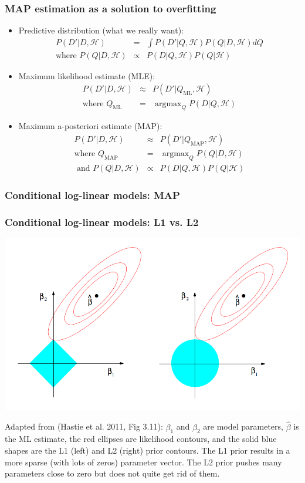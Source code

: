 \documentclass[ignorenonframetext,plain]{beamer}
\DeclareMathOperator*{\argmax}{argmax}
\begin{document}
\begin{frame}\frametitle{MAP estimation as a solution to overfitting}
\begin{itemize}
\item Predictive distribution (what we really want):\begin{eqnarray*}
  P(D'|D,\mathcal{H}) &=& \int P(D'|Q,\mathcal{H}) P(Q|D,\mathcal{H}) dQ \\
  \text{where } P(Q|D,\mathcal{H}) &\propto& P(D|Q,\mathcal{H}) P(Q|\mathcal{H})
\end{eqnarray*}
\item Maximum likelihood estimate (MLE):\begin{eqnarray*}
  P(D'|D,\mathcal{H}) &\approx& P(D'|Q_\text{ML}, \mathcal{H}) \\
\mbox{where } Q_\text{ML} &=& \argmax_Q P(D|Q,\mathcal{H})
\end{eqnarray*}
\item Maximum a-posteriori estimate (MAP):\begin{eqnarray*}
  P(D'|D,\mathcal{H}) &\approx& P(D'|Q_\text{MAP}, \mathcal{H}) \\
\mbox{where } Q_\text{MAP} &=& \argmax_Q P(Q|D,\mathcal{H}) \\
\mbox{ and } P(Q|D,\mathcal{H}) &\propto& P(D|Q,\mathcal{H}) P(Q|\mathcal{H})
\end{eqnarray*}
\end{itemize}
\end{frame}

\begin{frame}\frametitle{Conditional log-linear models: MAP} %

\end{frame}

\begin{frame}\frametitle{Conditional log-linear models: L1 vs. L2} %
\includegraphics[width=.9\textwidth]{images/hastie-fig-3-11.png}

\footnotesize Adapted from (Hastie et al. 2011, Fig 3.11): $\beta_1$
and $\beta_2$ are model parameters, $\hat{\beta}$ is the ML estimate,
the red ellipses are likelihood contours, and the solid blue shapes
are the L1 (left) and L2 (right) prior contours.  The L1 prior results
in a more sparse (with lots of zeros) parameter vector.  The L2 prior
pushes many parameters close to zero but does not quite get rid of
them.
\end{frame}
\end{document}
